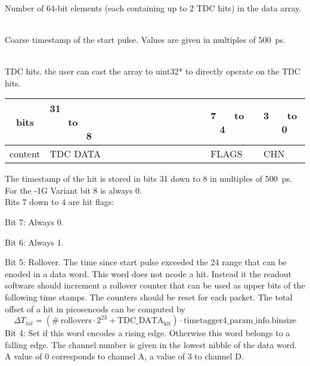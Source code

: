 	\\
	Number of 64-bit elements (each containing up to 2 TDC hits) in the data array.\par

	\\
	Coarse timestamp of the start pulse. Values are given in multiples of $500$~ps.\par

	\\
	TDC hits. the user can cast the array to uint32* to directly operate on the TDC hits.

	\noindent
	\begin{small}
	\begin{tabular}{|c||p{9cm}|p{}|p{}|}
		\hline
		bits & 31~ ~ ~ ~ ~ ~ ~ ~ ~ ~ ~ ~ ~ ~ ~ ~ ~ to ~ ~ ~ ~ ~ ~ ~ ~ ~ ~ ~ ~ ~ ~ ~ ~ ~ 8 & 7~ ~ to ~ ~ 4 & 3~ ~ to ~ ~ 0\\\hline
		content & TDC DATA & FLAGS & CHN \\\hline
	\end{tabular}
	\end{small}

	The timestamp of the hit is stored in bits 31 down to 8 in multiples of 500~ps. For the -1G Variant bit 8 is always 0.\\
	
	Bits 7 down to 4 are hit flags:\par
	Bit 7: Always 0.\par
	Bit 6: Always 1.\par
	Bit 5: Rollover. The time since start pulse exceeded the 24 range that can be enoded in a data word. This word does not ncode a hit. 
	Instead it the readout software should increment a rollover counter that can be used as upper bits of the following time stamps.  The counters should be reset for each packet.
	The total offset of a hit in picosencods can be computed by
	\[	\Delta T_{hit} = \mathrm{(\#\ rollovers \cdot 2^{23} + TDC\_ DATA_{hit}) \cdot timetagger4\_param\_info.binsize} \]
	\indent
	Bit 4: Set if this word encodes a rising edge. Otherwise this word belongs to a falling edge.
	The channel number is given in the lowest nibble of the data word. A value of 0 corresponds to channel A, a value of 3 to channel D.\par
